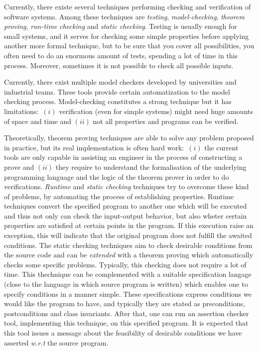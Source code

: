 \documentclass[a4paper]{llncs}
\begin{document}
Currently, there existe several techniques performing
checking and verification of software systems. Among these techniques
are \textit{testing}, \textit{model-checking}, \textit{theorem
proving}, \textit{run-time checking} and \textit{static
checking}. Testing is usually enough
for small systems, and it serves for checking some simple properties
before applying another more formal technique, but to be sure that you
cover all possibilities, you often need to do an enormous amount
of tests, spending a lot of time in this process. Moreover, sometimes
it is not possible to check all possible inputs. 

Currently, there
exist multiple model checkers
developed by universities and industrial teams. These tools provide
certain automatization to the model checking process. Model-checking
constitutes a strong technique
but it has limitations$:$ $(i)$ verification (even for simple systems)
might
need huge amounts of space and time and $(ii)$ not all properties and
programs can be verified. 

Theoretically,
theorem proving techniques are able to solve any problem proposed in
practice, but its real implementation is often hard work$:$ $(i)$ the
current tools are only capable in assisting an
engineer in the process of constructing a prove and $(ii)$ they
require to understand the formalisation of the underlying programming
language and the logic of the theorem prover in order to do
verifications. \textit{Runtime} and \textit{static checking}
techniques try to overcome these kind of problems, by automating the
process
of establishing properties. Runtime techniques convert the specified
program to another one which will be executed and thus not only can
check
the input-output behavior, but also wheter certain properties are
satisfied at certain points in the program. If this execution raise
an exception, this will indicate that the
original program does not fulfill the awaited conditions. The static
checking
techniques aim to check desirable conditions from the
source code and can be \emph{extended} with a theorem proving which
automatically checks some specific problems. Typically, this checking
does not require a lot of time. This
thechnique can be complemented with a suitable specification
langage (close to the language in which source program is written)
which enables one to specify conditions in a manner simple.
These specifications express
conditions we would like the program to have, and
typically they are stated as
preconditions, postconditions and class invariants. After that, one
can run an assertion checker tool, implementing this technique, on
this specified program. It is expected that this tool issues a message
about the feasibility of desirable conditions we have asserted
\emph{w.r.t} the source program. 
\end{document}
